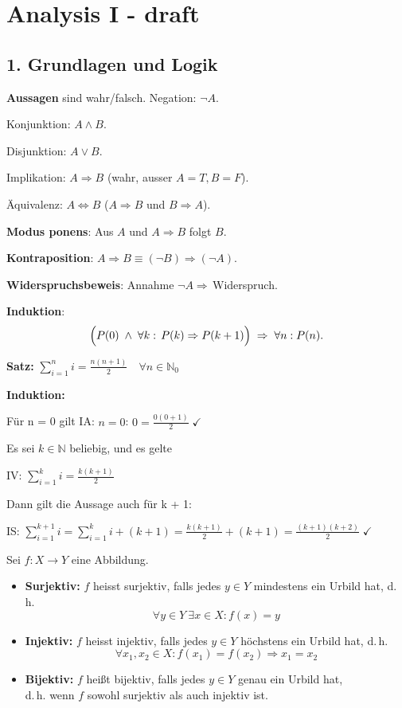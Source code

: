 \section{Analysis I - draft}

\subsection{1. Grundlagen und Logik}
\textbf{Aussagen} sind wahr/falsch.  
Negation: $\lnot A$.  

Konjunktion: $A\wedge B$.  

Disjunktion: $A\vee B$.  

Implikation: $A\Rightarrow B$ (wahr, ausser $A=T,B=F$).  

Äquivalenz: $A\Leftrightarrow B$ ($A\Rightarrow B$ und $B\Rightarrow A$). 

\textbf{Modus ponens}: Aus $A$ und $A\Rightarrow B$ folgt $B$.  

\textbf{Kontraposition}: $A\Rightarrow B\equiv(\lnot B)\Rightarrow(\lnot A)$.  

\textbf{Widerspruchsbeweis}: Annahme $\lnot A\Rightarrow\,$Widerspruch.  

\textbf{Induktion}:  
\[
\Bigl(P(0)\;\wedge\;\forall k:\,P(k)\Rightarrow P(k+1)\Bigr)\;\Rightarrow\;\forall n:P(n).
\]

\textbf{Satz:} \(\displaystyle \sum_{i=1}^n i = \frac{n(n+1)}{2} \quad \forall n \in \mathbb{N}_0\)

\textbf{Induktion:}

Für n = 0 gilt
IA: \(n = 0\): \(0 = \frac{0(0+1)}{2}\;\checkmark\)

Es sei $k \in \mathbb{N}$ beliebig, und es gelte

IV: \(\sum_{i=1}^k i = \frac{k(k+1)}{2}\)

Dann gilt die Aussage auch für k + 1:

IS: \(\sum_{i=1}^{k+1} i = \sum_{i=1}^k i + (k+1)
= \frac{k(k+1)}{2} + (k+1)
= \frac{(k+1)(k+2)}{2}\;\checkmark\)

Sei \( f : X \to Y \) eine Abbildung.

\begin{itemize}[left=0pt, itemsep=1.5em]

  \item \textbf{Surjektiv:} \( f \) heisst surjektiv, falls jedes \( y \in Y \) mindestens ein Urbild hat, d.\,h.
  \[
  \forall y \in Y\ \exists x \in X : f(x) = y
  \]

  \item \textbf{Injektiv:} \( f \) heisst injektiv, falls jedes \( y \in Y \) höchstens ein Urbild hat, d.\,h.
  \[
  \forall x_1, x_2 \in X : f(x_1) = f(x_2) \Rightarrow x_1 = x_2
  \]

  \item \textbf{Bijektiv:} \( f \) heißt bijektiv, falls jedes \( y \in Y \) genau ein Urbild hat,\\
  d.\,h. wenn \( f \) sowohl surjektiv als auch injektiv ist.

\end{itemize}

